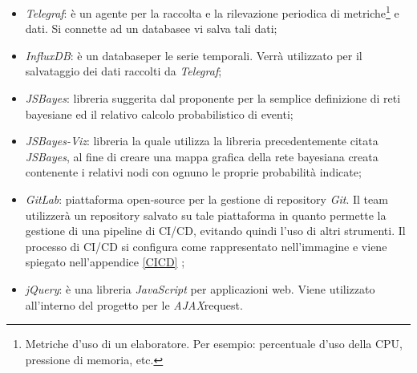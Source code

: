\begin{itemize} 
	\item \textit{Telegraf}\glossario: è un agente per la raccolta e la rilevazione periodica di metriche\footnote{Metriche d'uso di un elaboratore. Per esempio: percentuale d'uso della CPU, pressione di memoria, etc.} e dati. Si connette ad un database\glossario e vi salva tali dati;
	\item \textit{InfluxDB}\glossario: è un database\glossario per le serie temporali. Verrà utilizzato per il salvataggio dei dati raccolti da \textit{Telegraf};
	\item \textit{JSBayes}\glossario: libreria suggerita dal proponente per la semplice definizione di reti bayesiane ed il relativo calcolo probabilistico di eventi; 
	\item \textit{JSBayes-Viz}\glossario: libreria la quale utilizza la libreria precedentemente citata \textit{JSBayes}, al fine di creare una mappa grafica della rete bayesiana creata contenente i relativi nodi con ognuno le proprie probabilità indicate; 
	\item \textit{GitLab}\glossario: piattaforma open-source per la gestione di repository \textit{Git}. Il team utilizzerà un repository salvato su tale piattaforma in quanto permette la gestione di una pipeline di CI/CD\glossario, evitando quindi l'uso di altri strumenti. Il processo di CI/CD si configura come rappresentato nell'immagine e viene spiegato nell'appendice \ref{CICD} ;
	\item \textit{jQuery}\glossario: è una libreria \textit{JavaScript} per applicazioni web. Viene utilizzato all'interno del progetto per le \textit{AJAX}\glossario request.
\end{itemize}

